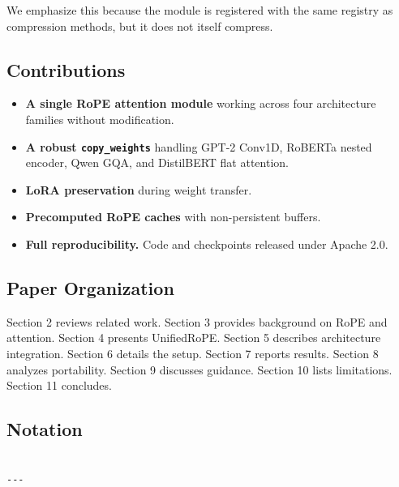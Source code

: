 We emphasize this because the module is registered with the same registry 
as compression methods, but it does not itself compress.

\subsection{Contributions}

\begin{itemize}
\item \textbf{A single RoPE attention module} working across four architecture
  families without modification.
\item \textbf{A robust \texttt{copy\_weights}} handling GPT-2 Conv1D, RoBERTa nested
  encoder, Qwen GQA, and DistilBERT flat attention.
\item \textbf{LoRA preservation} during weight transfer.
\item \textbf{Precomputed RoPE caches} with non-persistent buffers.
\item \textbf{Full reproducibility.} Code and checkpoints released under
  Apache 2.0.

\end{itemize}
\subsection{Paper Organization}

Section 2 reviews related work. Section 3 provides background on RoPE and 
attention. Section 4 presents UnifiedRoPE. Section 5 describes 
architecture integration. Section 6 details the setup. Section 7 reports 
results. Section 8 analyzes portability. Section 9 discusses guidance. 
Section 10 lists limitations. Section 11 concludes.



\subsection{Notation}

\begin{lstlisting}

---
\end{lstlisting}